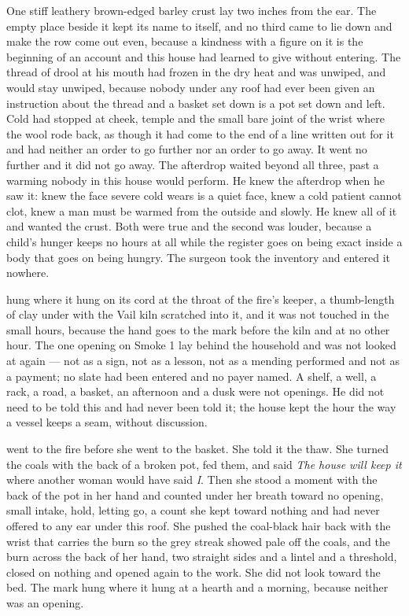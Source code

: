 One stiff leathery brown-edged barley crust lay two inches from the ear. The empty place beside it kept its name to itself, and no third came to lie down and make the row come out even, because a kindness with a figure on it is the beginning of an account and this house had learned to give without entering. The thread of drool at his mouth had frozen in the dry heat and was unwiped, and would stay unwiped, because nobody under any roof had ever been given an instruction about the thread and a basket set down is a pot set down and left. Cold had stopped at cheek, temple and the small bare joint of the wrist where the wool rode back, as though it had come to the end of a line written out for it and had neither an order to go further nor an order to go away. It went no further and it did not go away. The afterdrop waited beyond all three, past a warming nobody in this house would perform. He knew the afterdrop when he saw it: knew the face severe cold wears is a quiet face, knew a cold patient cannot clot, knew a man must be warmed from the outside and slowly. He knew all of it and wanted the crust. Both were true and the second was louder, because a child's hunger keeps no hours at all while the register goes on being exact inside a body that goes on being hungry. The surgeon took the inventory and entered it nowhere.

 hung where it hung on its cord at the throat of the fire's keeper, a thumb-length of clay under  with the Vail kiln scratched into it, and it was not touched in the small hours, because the hand goes to the mark before the kiln and at no other hour. The one opening on Smoke 1 lay behind the household and was not looked at again --- not as a sign, not as a lesson, not as a mending performed and not as a payment; no slate had been entered and no payer named. A shelf, a well, a rack, a road, a basket, an afternoon and a dusk were not openings. He did not need to be told this and had never been told it; the house kept the hour the way a vessel keeps a seam, without discussion.

\scenebreak

 went to the fire before she went to the basket. She told it the thaw. She turned the coals with the back of a broken pot, fed them, and said \emph{The house will keep it} where another woman would have said \emph{I}. Then she stood a moment with the back of the pot in her hand and counted under her breath toward no opening, small intake, hold, letting go, a count she kept toward nothing and had never offered to any ear under this roof. She pushed the coal-black hair back with the wrist that carries the burn so the grey streak showed pale off the coals, and the burn across the back of her hand, two straight sides and a lintel and a threshold, closed on nothing and opened again to the work. She did not look toward the bed. The mark hung where it hung at a hearth and a morning, because neither was an opening.

